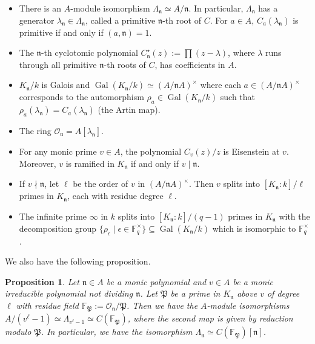 \documentclass[11pt]{amsart}
\theoremstyle{plain}
\newtheorem{prop}[thm]{Proposition}
\theoremstyle{definition}
\theoremstyle{remark}
\numberwithin{equation}{section}
\newcommand{\FF}{\mathbb{F}}
\newcommand{\nfk}{\mathfrak{n}}
\newcommand{\Pfk}{\mathfrak{P}}
\newcommand{\Ocal}{\mathcal{O}}
\newcommand{\Gal}{\operatorname{Gal}}
\newcommand{\sbe}{\subseteq}
\newcommand{\Fqst}{\FF_q^\times}
\let\l\ell
\begin{document}
	\begin{itemize}
		\item There is an $A$-module isomorphism $\Lambda_{\nfk} \simeq A/\nfk$.
		In particular, $\Lambda_{\nfk}$ has a generator $\lambda_\nfk \in \Lambda_\nfk$, called a primitive $\nfk$-th root of $C$.
		For $a\in A$, $C_a(\lambda_\nfk)$ is primitive if and only if $(a,\nfk) = 1$.
		
		\item The $\nfk$-th cyclotomic polynomial $C_\nfk^\star (z) := \prod (z-\lambda)$, where $\lambda$ runs through all primitive $\nfk$-th roots of $C$, has coefficients in $A$.
		
		\item $K_\nfk/k$ is Galois and $\Gal(K_\nfk/k) \simeq (A/\nfk A)^\times$ where each $a \in (A/\nfk A)^\times$ corresponds to the automorphism $\rho_a \in \Gal(K_\nfk/k)$ such that $\rho_a(\lambda_\nfk) = C_a(\lambda_\nfk)$ (the Artin map).
		
		\item The ring $\Ocal_\nfk = A[\lambda_\nfk]$.
		
		\item For any monic prime $v \in A$, the polynomial $C_v(z)/z$ is Eisenstein at $v$.
		Moreover, $v$ is ramified in $K_\nfk$ if and only if $v \mid \nfk$.
		
		\item If $v \nmid \nfk$, let $\l$ be the order of $v$ in $(A/\nfk A)^\times$.
		Then $v$ splits into $[K_\nfk : k]/\l$ primes in $K_\nfk$, each with residue degree $\l$.
		
		\item The infinite prime $\infty$ in $k$ splits into $[K_\nfk : k]/(q-1)$ primes in $K_\nfk$ with the decomposition group $\{\rho_\epsilon \mid \epsilon \in \Fqst\} \sbe \Gal(K_\nfk/k)$ which is isomorphic to $\Fqst$.
	\end{itemize}
	
	We also have the following proposition.
	
	\begin{prop}     \label{reduction-of-lambda}
		Let $\nfk \in A$ be a monic polynomial and $v \in A$ be a monic irreducible polynomial not dividing $\nfk$.
		Let $\Pfk$ be a prime in $K_\nfk$ above $v$ of degree $\l$ with residue field $\FF_{\Pfk} := \Ocal_\nfk/\Pfk$.
		Then we have the $A$-module isomorphisms $A/(v^\l-1) \simeq \Lambda_{v^\l-1} \simeq C(\FF_{\Pfk})$, where the second map is given by reduction modulo $\Pfk$.
		In particular, we have the isomorphism $\Lambda_{\nfk} \simeq C(\FF_{\Pfk})[\nfk]$.
	\end{prop}
	
\end{document}
